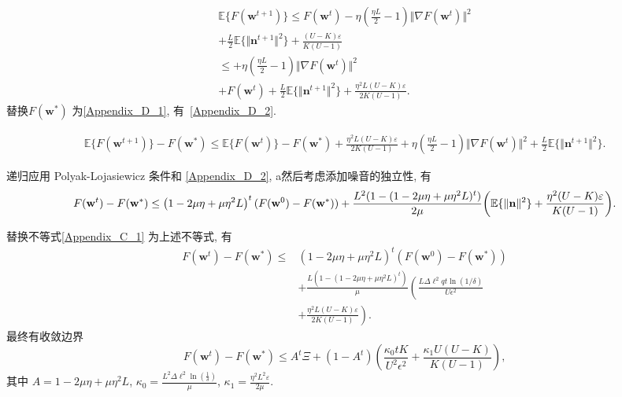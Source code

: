 \begin{multline}
\label{Appendix_D_1}
\mathbb{E}\{F(\mathbf{w}^{t+1})\}\leq F(\mathbf{w}^{t})-\eta\left(\frac{\eta L}{2}-1\right)\Vert \nabla F(\mathbf{w}^{t})\Vert^{2}\\
+\frac{L}{2}\mathbb{E}\{\Vert\mathbf{n}^{t+1}\Vert^{2}\}+\frac{(U-K)\varepsilon}{K(U-1)} \\
\leq +\eta\left(\frac{\eta L}{2}-1\right)\Vert \nabla F(\mathbf{w}^{t})\Vert^{2}\\
+F(\mathbf{w}^{t})+\frac{L}{2}\mathbb{E}\{\Vert\mathbf{n}^{t+1}\Vert^{2}\}+\frac{\eta^{2} L(U-K)\varepsilon}{2K(U-1)}.
\end{multline}
替换$F(\mathbf{w}^{*})$ 为\eqref{Appendix_D_1}, 有~\eqref{Appendix_D_2}.
\begin{figure}[htb]
\normalsize
\begin{equation}\label{Appendix_D_2}
\begin{aligned}
\mathbb{E}\{F(\mathbf{w}^{t+1})\}-F(\mathbf{w}^{*})\leq \mathbb{E}\{F(\mathbf{w}^{t})\}-F(\mathbf{w}^{*})+\frac{\eta^{2} L(U-K)\varepsilon}{2K(U-1)}+\eta\left(\frac{\eta L}{2}-1\right)\Vert \nabla F(\mathbf{w}^{t})\Vert^{2}+\frac{L}{2}\mathbb{E}\{\Vert\mathbf{n}^{t+1}\Vert^{2}\}.
\end{aligned}
\end{equation}
\vspace*{4pt}
\end{figure}
递归应用 Polyak-Lojasiewicz 条件和 \eqref{Appendix_D_2}, a然后考虑添加噪音的独立性, 有
\begin{equation}
F(\mathbf{w}^{t})-F(\mathbf{w}^{*})\leq \left(1-2\mu\eta+\mu\eta^{2}L\right)^{t}(F(\mathbf{w}^{0})-F(\mathbf{w}^{*}))\\
+\frac{L^2(1-(1-2\mu\eta+\mu\eta^{2}L)^{t})}{2\mu}\bigg{(}\mathbb{E}\{\Vert\mathbf{n}\Vert^{2}\}\\
+\frac{\eta^{2} (U-K)\varepsilon}{K(U-1)}\bigg{)}.
\end{equation}

替换不等式\eqref{Appendix_C_1} 为上述不等式, 有
\begin{equation}
    \begin{aligned}
F(\mathbf{w}^{t})-F(\mathbf{w}^{*})\leq & \left(1-2\mu\eta+\mu\eta^{2}L\right)^{t}(F(\mathbf{w}^{0})-F(\mathbf{w}^{*}))\\
& +\frac{L(1-(1-2\mu\eta+\mu\eta^{2}L)^{t})}{\mu}\left(\frac{L\Delta\ell^{2}qt\ln(1/\delta)}{U\epsilon^{2}}\right. \\
& \left.+\frac{\eta^{2} L(U-K)\varepsilon}{2K(U-1)}\right).
\end{aligned}
\end{equation}
最终有收敛边界
\begin{equation}
F(\mathbf{w}^{t})-F(\mathbf{w}^{*})\leq A^{t}\Xi
+(1-A^t)\left(\frac{\kappa_{0}tK}{U^2\epsilon^2}+\frac{\kappa_{1}U(U-K)}{K(U-1)}\right),
\end{equation}
其中 $A = 1-2\mu\eta+\mu\eta^{2}L$, $\kappa_{0} = \frac{L^2\Delta\ell^2\ln(\frac{1}{\delta})}{\mu}$, $\kappa_{1} = \frac{\eta^{2} L^{2}\varepsilon}{2\mu}$. 
  
